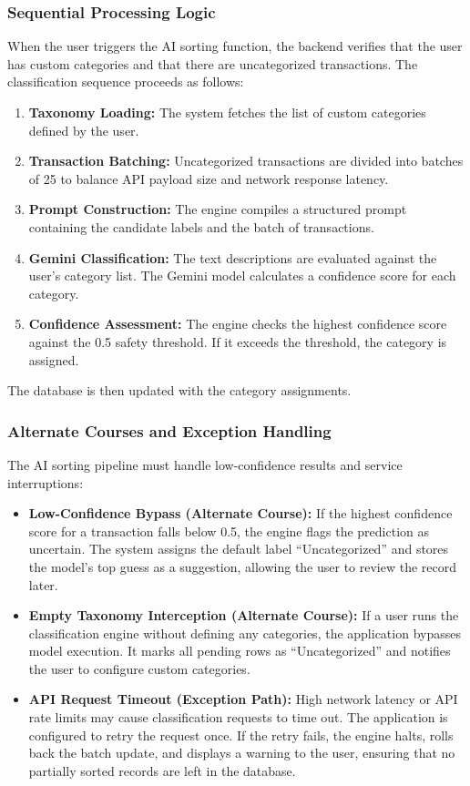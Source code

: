 \subsubsection{Sequential Processing Logic}
When the user triggers the AI sorting function, the backend verifies that the user has custom categories and that there are uncategorized transactions. The classification sequence proceeds as follows:
\begin{enumerate}
	\item \textbf{Taxonomy Loading:} The system fetches the list of custom categories defined by the user.
	\item \textbf{Transaction Batching:} Uncategorized transactions are divided into batches of 25 to balance API payload size and network response latency.
	\item \textbf{Prompt Construction:} The engine compiles a structured prompt containing the candidate labels and the batch of transactions.
	\item \textbf{Gemini Classification:} The text descriptions are evaluated against the user's category list. The Gemini model calculates a confidence score for each category.
	\item \textbf{Confidence Assessment:} The engine checks the highest confidence score against the 0.5 safety threshold. If it exceeds the threshold, the category is assigned.
\end{enumerate}
The database is then updated with the category assignments.

\subsubsection{Alternate Courses and Exception Handling}
The AI sorting pipeline must handle low-confidence results and service interruptions:
\begin{itemize}
	\item \textbf{Low-Confidence Bypass (Alternate Course):} If the highest confidence score for a transaction falls below 0.5, the engine flags the prediction as uncertain. The system assigns the default label ``Uncategorized'' and stores the model's top guess as a suggestion, allowing the user to review the record later.
	\item \textbf{Empty Taxonomy Interception (Alternate Course):} If a user runs the classification engine without defining any categories, the application bypasses model execution. It marks all pending rows as ``Uncategorized'' and notifies the user to configure custom categories.
	\item \textbf{API Request Timeout (Exception Path):} High network latency or API rate limits may cause classification requests to time out. The application is configured to retry the request once. If the retry fails, the engine halts, rolls back the batch update, and displays a warning to the user, ensuring that no partially sorted records are left in the database.
\end{itemize}

